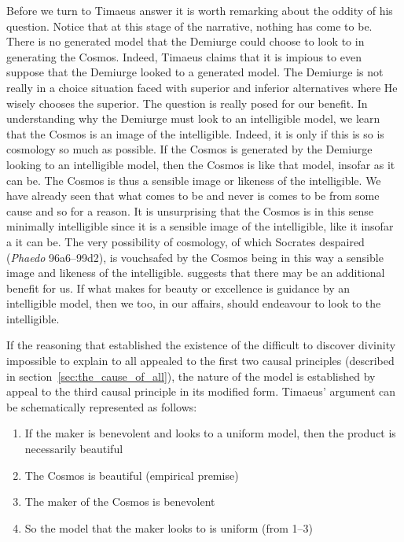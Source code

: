 Before we turn to Timaeus answer it is worth remarking about the oddity of his question. Notice that at this stage of the narrative, nothing has come to be. There is no generated model that the Demiurge could choose to look to in generating the Cosmos. Indeed, Timaeus claims that it is impious to even suppose that the Demiurge looked to a generated model. The Demiurge is not really in a choice situation faced with superior and inferior alternatives where He wisely chooses the superior. The question is really posed for our benefit. In understanding why the Demiurge must look to an intelligible model, we learn that the Cosmos is an image of the intelligible. Indeed, it is only if this is so is cosmology so much as possible. If the Cosmos is generated by the Demiurge looking to an intelligible model, then the Cosmos is like that model, insofar as it can be. The Cosmos is thus a sensible image or likeness of the intelligible. We have already seen that what comes to be and never is comes to be from some cause and so for a reason. It is unsurprising that the Cosmos is in this sense minimally intelligible since it is a sensible image of the intelligible, like it insofar a it can be. The very possibility of cosmology, of which Socrates despaired (\emph{Phaedo} 96a6–99d2), is vouchsafed by the Cosmos being in this way a sensible image and likeness of the intelligible. \citet[28--9]{Broadie:2012vl} suggests that there may be an additional benefit for us. If what makes for beauty or excellence is guidance by an intelligible model, then we too, in our affairs, should endeavour to look to the intelligible.

If the reasoning that established the existence of the difficult to discover divinity impossible to explain to all appealed to the first two causal principles (described in section~\ref{sec:the_cause_of_all}), the nature of the model is established by appeal to the third causal principle in its modified form. Timaeus' argument can be schematically represented as follows:
\begin{enumerate}[(1)]
	\item If the maker is benevolent and looks to a uniform model, then the product is necessarily beautiful
	\item The Cosmos is beautiful (empirical premise)
	\item The maker of the Cosmos is benevolent
	\item So the model that the maker looks to is uniform (from 1--3)
\end{enumerate}


